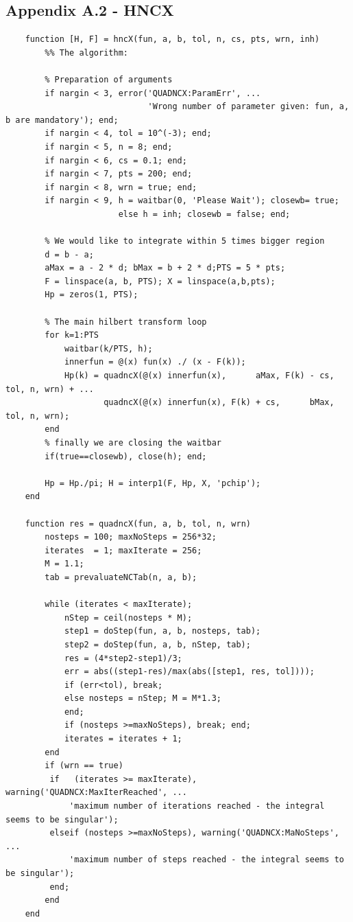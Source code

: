 \documentclass[12pt,twoside,a4paper]{article}
\numberwithin{equation}{subsection}
\numberwithin{figure}{subsection}
\begin{document}
\subsection*{Appendix A.2 - HNCX}
\begin{lstlisting}
	function [H, F] = hncX(fun, a, b, tol, n, cs, pts, wrn, inh)    
	    %% The algorithm:
	    
	    % Preparation of arguments
	    if nargin < 3, error('QUADNCX:ParamErr', ...
	                         'Wrong number of parameter given: fun, a, b are mandatory'); end;
	    if nargin < 4, tol = 10^(-3); end;
	    if nargin < 5, n = 8; end;
	    if nargin < 6, cs = 0.1; end;
	    if nargin < 7, pts = 200; end;
	    if nargin < 8, wrn = true; end;
	    if nargin < 9, h = waitbar(0, 'Please Wait'); closewb= true; 
	                   else h = inh; closewb = false; end;
	    
	    % We would like to integrate within 5 times bigger region
	    d = b - a;
	    aMax = a - 2 * d; bMax = b + 2 * d;PTS = 5 * pts;
	    F = linspace(a, b, PTS); X = linspace(a,b,pts);
	    Hp = zeros(1, PTS);
	    
	    % The main hilbert transform loop
	    for k=1:PTS
	        waitbar(k/PTS, h);
	        innerfun = @(x) fun(x) ./ (x - F(k));
	        Hp(k) = quadncX(@(x) innerfun(x),      aMax, F(k) - cs, tol, n, wrn) + ...
	                quadncX(@(x) innerfun(x), F(k) + cs,      bMax, tol, n, wrn);
	    end
	    % finally we are closing the waitbar
	    if(true==closewb), close(h); end;
	    
	    Hp = Hp./pi; H = interp1(F, Hp, X, 'pchip');
	end
	
	function res = quadncX(fun, a, b, tol, n, wrn)    
	    nosteps = 100; maxNoSteps = 256*32;
	    iterates  = 1; maxIterate = 256;
	    M = 1.1;
	    tab = prevaluateNCTab(n, a, b);
	    
	    while (iterates < maxIterate);
	        nStep = ceil(nosteps * M);
	        step1 = doStep(fun, a, b, nosteps, tab);
	        step2 = doStep(fun, a, b, nStep, tab);
	        res = (4*step2-step1)/3; 
	        err = abs((step1-res)/max(abs([step1, res, tol])));
	        if (err<tol), break;
	        else nosteps = nStep; M = M*1.3;
	        end;
	        if (nosteps >=maxNoSteps), break; end;
	        iterates = iterates + 1;
	    end
	    if (wrn == true)
	     if   (iterates >= maxIterate), warning('QUADNCX:MaxIterReached', ...
	         'maximum number of iterations reached - the integral seems to be singular'); 
         elseif (nosteps >=maxNoSteps), warning('QUADNCX:MaNoSteps', ...
             'maximum number of steps reached - the integral seems to be singular'); 
         end; 
        end
	end
	

\end{lstlisting}
\end{document}
